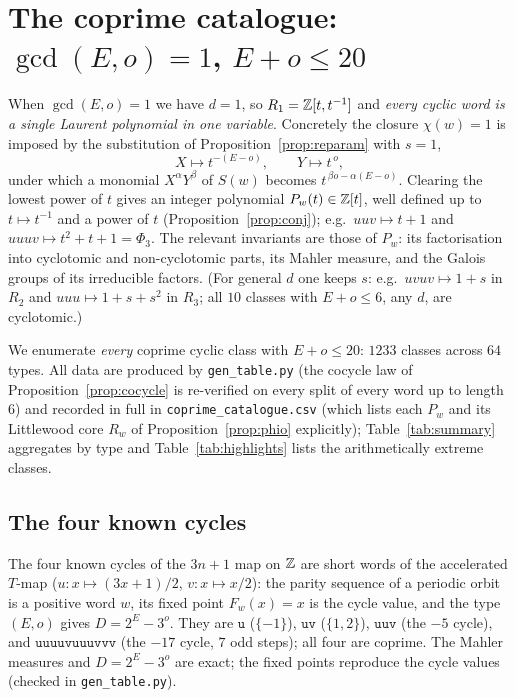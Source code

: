 \section{The coprime catalogue: $\gcd(E,o)=1$, $E+o\le 20$}

When $\gcd(E,o)=1$ we have $d=1$, so $R_1=\mathbb{Z}[t,t^{-1}]$ and \emph{every cyclic word is a
single Laurent polynomial in one variable}. Concretely the closure $\chi(w)=1$ is imposed by
the substitution of Proposition~\ref{prop:reparam} with $s=1$,
\[
   X\longmapsto t^{-(E-o)},\qquad Y\longmapsto t^{\,o},
\]
under which a monomial $X^{\alpha}Y^{\beta}$ of $S(w)$ becomes $t^{\,\beta o-\alpha(E-o)}$.
Clearing the lowest power of $t$ gives an integer polynomial $P_w(t)\in\mathbb{Z}[t]$, well defined up
to $t\mapsto t^{-1}$ and a power of $t$ (Proposition~\ref{prop:conj}); e.g.\ $uuv\mapsto t+1$
and $uuuv\mapsto t^2+t+1=\Phi_3$. The relevant invariants are those of $P_w$: its factorisation
into cyclotomic and non-cyclotomic parts, its Mahler measure, and the Galois groups of its
irreducible factors. (For general $d$ one keeps $s$: e.g.\ $uvuv\mapsto 1+s$ in $R_2$ and
$uuu\mapsto1+s+s^2$ in $R_3$; all $10$ classes with $E+o\le6$, any $d$, are cyclotomic.)

We enumerate \emph{every} coprime cyclic class with $E+o\le20$: $1233$ classes across $64$
types. All data are produced by \texttt{gen\_table.py} (the cocycle law of
Proposition~\ref{prop:cocycle} is re-verified on every split of every word up to length~$6$)
and recorded in full in \texttt{coprime\_catalogue.csv} (which lists each $P_w$ and its
Littlewood core $R_w$ of Proposition~\ref{prop:phio} explicitly); Table~\ref{tab:summary}
aggregates by type and Table~\ref{tab:highlights} lists the arithmetically extreme classes.

\subsection*{The four known cycles}

The four known cycles of the $3n+1$ map on $\mathbb{Z}$ are short words of the accelerated $T$-map
($u:x\mapsto(3x+1)/2$, $v:x\mapsto x/2$): the parity sequence of a periodic orbit is a positive
word $w$, its fixed point $F_w(x)=x$ is the cycle value, and the type $(E,o)$ gives
$D=2^{E}-3^{o}$. They are $\mathtt{u}$ ($\{-1\}$), $\mathtt{uv}$ ($\{1,2\}$), $\mathtt{uuv}$
(the $-5$ cycle), and $\mathtt{uuuuvuuuvvv}$ (the $-17$ cycle, $7$ odd steps); all four are
coprime. The Mahler measures and $D=2^E-3^o$ are exact; the fixed points reproduce the cycle
values (checked in \texttt{gen\_table.py}).

